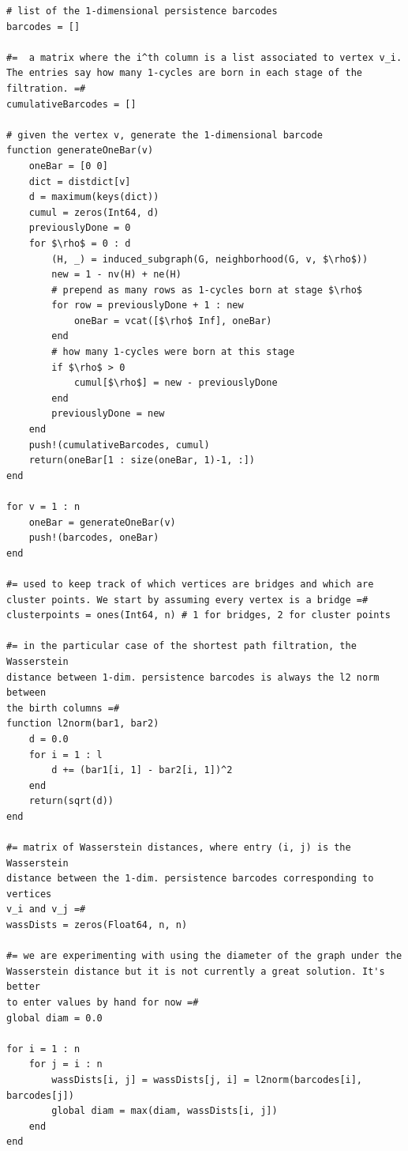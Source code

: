 \documentclass[12pt,a4paper]{amsart}
\numberwithin{equation}{section}
\theoremstyle{plain}
\theoremstyle{definition}
\begin{document}
\begin{lstlisting}[mathescape=true]
# list of the 1-dimensional persistence barcodes
barcodes = []

#=  a matrix where the i^th column is a list associated to vertex v_i. 
The entries say how many 1-cycles are born in each stage of the filtration. =#
cumulativeBarcodes = []

# given the vertex v, generate the 1-dimensional barcode
function generateOneBar(v)
    oneBar = [0 0]
    dict = distdict[v]
    d = maximum(keys(dict))
    cumul = zeros(Int64, d)
    previouslyDone = 0
    for $\rho$ = 0 : d
        (H, _) = induced_subgraph(G, neighborhood(G, v, $\rho$))
        new = 1 - nv(H) + ne(H)
        # prepend as many rows as 1-cycles born at stage $\rho$
        for row = previouslyDone + 1 : new
            oneBar = vcat([$\rho$ Inf], oneBar)
        end
        # how many 1-cycles were born at this stage
        if $\rho$ > 0
            cumul[$\rho$] = new - previouslyDone
        end
        previouslyDone = new
    end
    push!(cumulativeBarcodes, cumul)
    return(oneBar[1 : size(oneBar, 1)-1, :])
end

for v = 1 : n
    oneBar = generateOneBar(v)
    push!(barcodes, oneBar)
end

#= used to keep track of which vertices are bridges and which are 
cluster points. We start by assuming every vertex is a bridge =#
clusterpoints = ones(Int64, n) # 1 for bridges, 2 for cluster points

#= in the particular case of the shortest path filtration, the Wasserstein
distance between 1-dim. persistence barcodes is always the l2 norm between
the birth columns =#
function l2norm(bar1, bar2)
    d = 0.0
    for i = 1 : l
        d += (bar1[i, 1] - bar2[i, 1])^2
    end
    return(sqrt(d))
end

#= matrix of Wasserstein distances, where entry (i, j) is the Wasserstein 
distance between the 1-dim. persistence barcodes corresponding to vertices 
v_i and v_j =#
wassDists = zeros(Float64, n, n)

#= we are experimenting with using the diameter of the graph under the
Wasserstein distance but it is not currently a great solution. It's better
to enter values by hand for now =#
global diam = 0.0

for i = 1 : n
    for j = i : n
        wassDists[i, j] = wassDists[j, i] = l2norm(barcodes[i], barcodes[j])
        global diam = max(diam, wassDists[i, j])
    end
end










\end{lstlisting}
\end{document}
